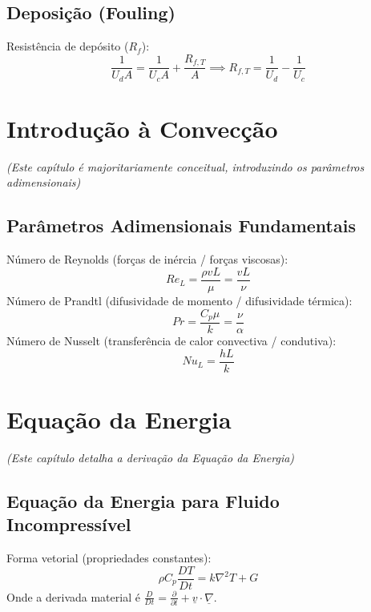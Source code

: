 \documentclass[12pt, a4paper]{article}
\begin{document}
\subsection{Deposição (Fouling)}
Resistência de depósito ($R_f$):
\begin{equation}
    \frac{1}{U_d A} = \frac{1}{U_c A} + \frac{R_{f,T}}{A} \implies R_{f,T} = \frac{1}{U_d} - \frac{1}{U_c}
\end{equation}

\newpage

\section{Introdução à Convecção}
\textit{(Este capítulo é majoritariamente conceitual, introduzindo os parâmetros adimensionais)}

\subsection{Parâmetros Adimensionais Fundamentais}
Número de Reynolds (forças de inércia / forças viscosas):
\begin{equation}
    Re_L = \frac{\rho v L}{\mu} = \frac{vL}{\nu}
\end{equation}
Número de Prandtl (difusividade de momento / difusividade térmica):
\begin{equation}
    Pr = \frac{C_p \mu}{k} = \frac{\nu}{\alpha}
\end{equation}
Número de Nusselt (transferência de calor convectiva / condutiva):
\begin{equation}
    Nu_L = \frac{hL}{k}
\end{equation}

\section{Equação da Energia}
\textit{(Este capítulo detalha a derivação da Equação da Energia)}

\subsection{Equação da Energia para Fluido Incompressível}
Forma vetorial (propriedades constantes):
\begin{equation}
    \rho C_p \frac{DT}{Dt} = k \nabla^2 T + G
\end{equation}
Onde a derivada material é $\frac{D}{Dt} = \frac{\partial}{\partial t} + \underline{v} \cdot \underline{\nabla}$.
\end{document}
